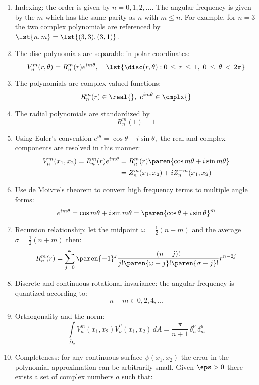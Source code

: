 \begin{enumerate}
\item Indexing: the order is given by $n=0,1,2,\dots$. The angular frequency is given by the $m$ which has the same parity as $n$ with $m\le n$. For example, for $n=3$ the two complex polynomials are referenced by $\lst{n,m} = \lst{(3,3),(3,1)}$.
%
\item The disc polynomials are separable in polar coordinates:
$$V_n^m(r,\theta) = R_n^{m}(r)e^{i m \theta}, \quad \lst{\disc(r,\theta):0\, \le \, r \, \le \, 1, \ 0 \, \le \, \theta \, < \, 2 \pi}$$
%
\item The polynomials are complex-valued functions:
$$R_n^{m}(r) \in \real{}, \ e^{i m \theta} \in \cmplx{}$$
%
\item The radial polynomials are standardized by
$$R_n^{m}(1) = 1$$
%
\item Using Euler's convention $e^{i \theta} = \cos \theta + i \sin \theta,$ the real and complex components are resolved in this manner: 
\begin{equation*}
  \begin{split}
    V_n^m(x_1,x_2) = R_n^m(r)e^{i m \theta} & = R_n^{m}(r)\paren{\cos m\theta + i \sin m\theta} \\
     & = Z_n^m(x_1,x_2) + i Z_n^{-m}(x_1,x_2)
  \end{split}
\end{equation*}
%
\item Use de Moivre's theorem to convert high frequency terms to multiple angle forms:
\begin{equation*}
 e^{i m \theta} = \cos m\theta + i \sin m\theta = \paren{\cos \theta + i \sin \theta}^m
\end{equation*}
%
\item Recursion relationship: let the midpoint $\omega=\frac{1}{2}(n-m)$ and the average $\sigma=\frac{1}{2}(n+m)$ then: 
\begin{equation}
  R_n^m(r) = \sum_{j=0}^{\omega}{\paren{-1}^j\frac{(n-j)!}{j!\paren{\omega-j}!\paren{\sigma-j}!}r^{n-2j}}
  \label{eq:recursion}
\end{equation}
%
\item Discrete and continuous rotational invariance: the angular frequency is quantized according to:
$$n-m \in 0, 2, 4, \dots$$
%
\item Orthogonality and the norm:
$$ \int\limits_{\overline{D}_2}{V_{n}^{m}(x_1,x_2) \overline{V}_{\nu}^{\mu}(x_1,x_2)\,dA} = \frac{\pi}{n+1}\,\delta_n^\nu \,\delta_m^\mu$$
%
\item Completeness: for any continuous surface $\psi(x_1,x_2)$ the error in the polynomial approximation can be arbitrarily small. Given $\eps>0$ there exists a set of complex numbers $a$ such that:

\end{enumerate}
